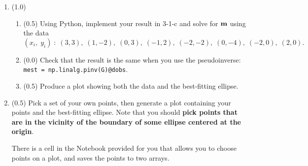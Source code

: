 \documentclass[11pt,titlepage,fleqn]{article}
\begin{document}
\begin{enumerate}

\item (1.0)
\begin{enumerate}
\item (0.5) Using Python, implement your result in 3-1-c and solve for $\mbox{${\bf m}$}$ using the data
%
\begin{equation*}
(x_i,\;y_i) \;:\; (3,3),\;(1,-2),\;(0,3),\;(-1,2),\;(-2,-2),\;(0,-4),\;(-2,0),\;(2,0).
\end{equation*}


\item (0.0) Check that the result is the same when you use the pseudoinverse: \\
\verb+mest = np.linalg.pinv(G)@dobs+.

\item (0.5) Produce a plot showing both the data and the best-fitting ellipse.

\end{enumerate}


\item (0.5) Pick a set of your own points, then generate a plot containing your points and the best-fitting ellipse. Note that you should {\bf pick points that are in the vicinity of the boundary of some ellipse centered at the origin}.

There is a cell in the Notebook provided for you that allows you to choose points on a plot, and saves the points to two arrays.



\end{enumerate}
\end{document}
